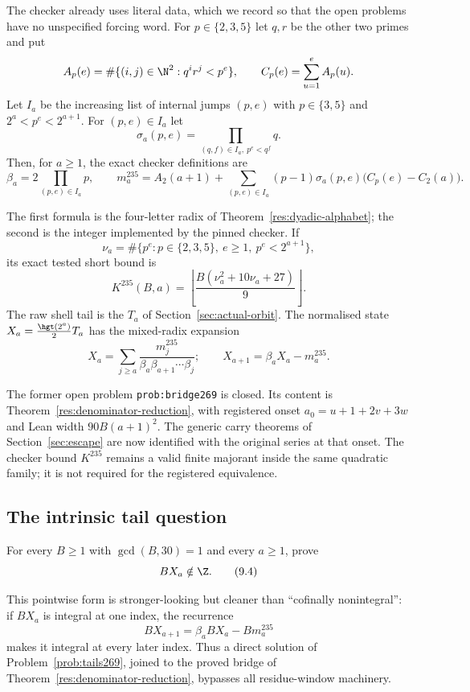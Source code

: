 The checker already uses literal data, which we record so that the open
problems have no unspecified forcing word.  For $p\in\{2,3,5\}$ let $q,r$ be
the other two primes and put
\[
 A_p(e)=\#\{(i,j)\in\N^2:q^i r^j<p^e\},\qquad
 C_p(e)=\sum_{u=1}^{e}A_p(u).
\]
Let $I_a$ be the increasing list of internal jumps $(p,e)$ with
$p\in\{3,5\}$ and $2^a<p^e<2^{a+1}$.  For $(p,e)\in I_a$ let
\[
 \sigma_a(p,e)=\prod_{(q,f)\in I_a,\ p^e<q^f}q.
\]
Then, for $a\ge1$, the exact checker definitions are
\[
 \beta_a=2\prod_{(p,e)\in I_a}p,\qquad
 m_a^{235}=A_2(a+1)+
   \sum_{(p,e)\in I_a}(p-1)\sigma_a(p,e)
       \bigl(C_p(e)-C_2(a)\bigr).
\tag{9.1}\label{eq:actual-digit}
\]

The first formula is the four-letter radix of
Theorem~\ref{res:dyadic-alphabet}; the second is the integer implemented by the
pinned checker.  If
\[
 \nu_a=\#\{p^e:p\in\{2,3,5\},\ e\ge1,\ p^e<2^{a+1}\},
\]
its exact tested short bound is
\[
 K^{235}(B,a)=
 \left\lfloor\frac{B(\nu_a^2+10\nu_a+27)}9\right\rfloor.
\tag{9.2}\label{eq:actual-bound}
\]
The raw shell tail is the $T_a$ of Section~\ref{sec:actual-orbit}.  The
normalised state $X_a=\frac{\hgt(2^a)}2T_a$ has the mixed-radix expansion
\[
 X_a=\sum_{j\ge a}
   \frac{m_j^{235}}{\beta_a\beta_{a+1}\cdots\beta_j};
 \qquad X_{a+1}=\beta_a X_a-m_a^{235}.
\tag{9.3}\label{eq:actual-tail}
\]

The former open problem \texttt{prob:bridge269} is closed.  Its content is
Theorem~\ref{res:denominator-reduction}, with registered onset
$a_0=u+1+2v+3w$ and Lean width $90B(a+1)^2$.  The generic carry theorems of
Section~\ref{sec:escape} are now identified with the original series at that
onset.  The checker bound $K^{235}$ remains a valid finite majorant inside
the same quadratic family; it is not required for the registered equivalence.

\subsection{The intrinsic tail question}

\begin{problem}\label{prob:tails269}
For every $B\ge1$ with $\gcd(B,30)=1$ and every $a\ge1$, prove
\[
 B X_a\notin\Z.
\tag{9.4}\label{eq:tail-nonintegrality}
\]
\end{problem}

This pointwise form is stronger-looking but cleaner than “cofinally
nonintegral”: if $B X_a$ is integral at one index, the recurrence
\[
 B X_{a+1}=\beta_a B X_a-Bm_a^{235}
\]
makes it integral at every later index.  Thus a direct solution of
Problem~\ref{prob:tails269}, joined to the proved bridge of
Theorem~\ref{res:denominator-reduction}, bypasses all residue-window
machinery.

